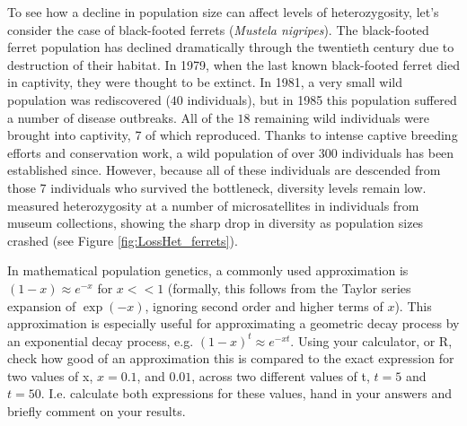 To see how a decline in population size can affect levels of
heterozygosity, let's consider the case of black-footed ferrets ({\it Mustela nigripes}). The black-footed ferret population has declined dramatically through the twentieth century due
to destruction of their habitat.  In 1979, when the last known black-footed ferret died in captivity, they were thought to be
extinct. In 1981, a very small wild population was rediscovered ($40$ individuals), but in 1985 this population 
suffered a number of disease outbreaks. All of the $18$ remaining wild individuals
were brought into captivity, 7 of which
reproduced. Thanks to intense captive breeding efforts and conservation work, a
wild population of over 300 individuals has been established
since. However, because all of these individuals are descended from
those 7 individuals who survived the bottleneck, diversity levels
remain low.  \citeauthor{Wisely:02} measured heterozygosity at a number
of microsatellites in individuals from museum collections, showing the sharp drop in diversity as population sizes crashed (see Figure \ref{fig:LossHet_ferrets}).

\begin{question} \label{geo_question} In mathematical population genetics, a
  commonly used approximation is $(1-x) \approx e^{-x}$ for $x << 1$ (formally,
  this follows from the Taylor series expansion of $\exp(-x)$, ignoring second
  order and higher terms of $x$).  This approximation is especially useful for approximating a geometric
  decay process by an exponential decay process, e.g. $(1 - x)^t \approx e^{-xt}$. Using your calculator, or R, check how good of an approximation this is compared to the exact expression for two values of x, $x = 0.1$, and $0.01$, across two different values of t, $t=5$ and $t=50$. I.e. calculate both expressions for these values, hand in your answers and briefly comment on your results. 
 
\end{question}

